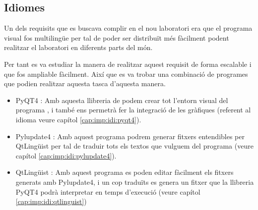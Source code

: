 





\subsection{Idiomes}\label{cap:dis:idi}

Un dels requisits que es buscava complir en el nou laboratori era que el programa visual fos multilingüe per tal de poder ser distribuït més fàcilment podent realitzar el laboratori en diferents parts del món.

Per tant es va estudiar la manera de realitzar aquest requisit de forma escalable i que fos ampliable fàcilment. Així que es va trobar una combinació de programes que podien realitzar aquesta tasca d'aquesta manera.

\begin{itemize}
	\item PyQT4 : Amb aquesta llibreria de \Python podem crear tot l'entorn visual del programa \DCSMonitor, i també ens permetrà fer la integració de les gràfiques (referent al idioma veure capítol \ref{cap:imp:idi:pyqt4}).
	\item Pylupdate4 : Amb aquest programa podrem generar fitxers entendibles per QtLingüist per tal de traduir tots els textos  que vulguem del programa (veure capítol \ref{cap:imp:idi:pylupdate4}).
	\item QtLingüist : Amb aquest programa es poden editar fàcilment els fitxers generats amb Pylupdate4, i un cop traduïts es genera un fitxer que la llibreria PyQT4 podrà interpretar en temps d'execució (veure capítol \ref{cap:imp:idi:qtlinguist})
\end{itemize}

